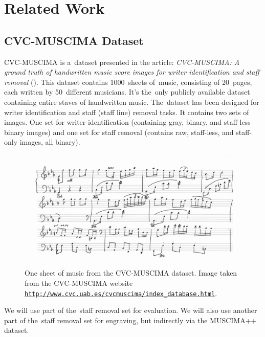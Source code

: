\chapter{Related Work}
\label{chap:RelatedWork}


\section{CVC-MUSCIMA Dataset}
\label{sec:CvcMuscima}

CVC-MUSCIMA is a~dataset presented in the article: \emph{CVC-MUSCIMA: A ground truth of handwritten music score images for writer identification and staff removal} (\cite{CvcMuscima}). This dataset contains 1000~sheets of~music, consisting of 20~pages, each written by 50~different musicians. It's the~only publicly available dataset containing entire staves of handwritten music. The~dataset has been designed for writer identification and staff (staff line) removal tasks. It contains two sets of images. One set for writer identification (containing gray, binary, and staff-less binary images) and one set for staff removal (contains raw, staff-less, and staff-only images, all binary).

\begin{figure}[h]
    \centering
    \includegraphics[width=140mm]{../img/cvc-muscima}
    \caption{One sheet of music from the CVC-MUSCIMA dataset. Image taken from the CVC-MUSCIMA website \href{http://www.cvc.uab.es/cvcmuscima/index_database.html}{\texttt{http://www.cvc.uab.es/{\allowbreak}cvc{\allowbreak}muscima/{\allowbreak}index\_database.html}}.}
    \label{fig2:CvcMuscima}
\end{figure}

We will use part of the~staff removal set for evaluation. We will also use another part of the~staff removal set for engraving, but indirectly via the MUSCIMA++ dataset.


